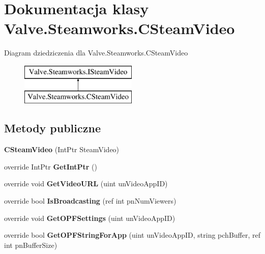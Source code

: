 \hypertarget{class_valve_1_1_steamworks_1_1_c_steam_video}{}\section{Dokumentacja klasy Valve.\+Steamworks.\+C\+Steam\+Video}
\label{class_valve_1_1_steamworks_1_1_c_steam_video}
Diagram dziedziczenia dla Valve.\+Steamworks.\+C\+Steam\+Video\begin{figure}[H]
\begin{center}
\leavevmode
\includegraphics[height=2.000000cm]{class_valve_1_1_steamworks_1_1_c_steam_video}
\end{center}
\end{figure}
\subsection*{Metody publiczne}
\begin{DoxyCompactItemize}
\item 
\mbox{\label{class_valve_1_1_steamworks_1_1_c_steam_video_a6568fe7dd8f57b8f9a4da7956c4ed2d7}} 
{\bfseries C\+Steam\+Video} (Int\+Ptr Steam\+Video)
\item 
\mbox{\label{class_valve_1_1_steamworks_1_1_c_steam_video_ac605dfbe9c48ca8a084149d4c12d6538}} 
override Int\+Ptr {\bfseries Get\+Int\+Ptr} ()
\item 
\mbox{\label{class_valve_1_1_steamworks_1_1_c_steam_video_aee288f527c38df5c59f4665f102cdb1e}} 
override void {\bfseries Get\+Video\+U\+RL} (uint un\+Video\+App\+ID)
\item 
\mbox{\label{class_valve_1_1_steamworks_1_1_c_steam_video_a7ae8a4bdc7c9ba5e44dcb4dbcb8e2edc}} 
override bool {\bfseries Is\+Broadcasting} (ref int pn\+Num\+Viewers)
\item 
\mbox{\label{class_valve_1_1_steamworks_1_1_c_steam_video_aea6de20548e3fb1d67838ef5bb8cbeac}} 
override void {\bfseries Get\+O\+P\+F\+Settings} (uint un\+Video\+App\+ID)
\item 
\mbox{\label{class_valve_1_1_steamworks_1_1_c_steam_video_afdbfa8bae18fea3fc45573540970988f}} 
override bool {\bfseries Get\+O\+P\+F\+String\+For\+App} (uint un\+Video\+App\+ID, string pch\+Buffer, ref int pn\+Buffer\+Size)
\end{DoxyCompactItemize}


